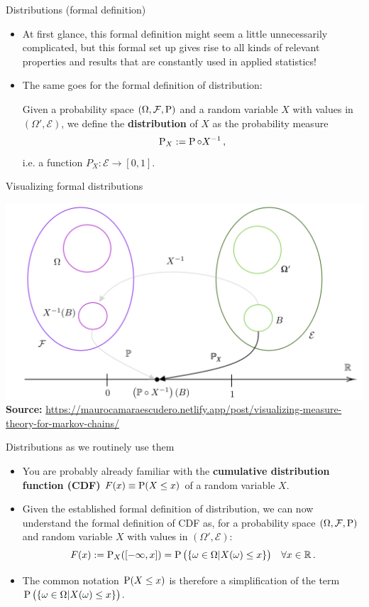 \documentclass[a4,11pt]{beamer}
\newcommand{\R}{\mathbb{R}}
\newlength{\wideitemsep}
\let\olditem\item
\renewcommand{\item}{\setlength{\itemsep}{\wideitemsep}\olditem}
\begin{document}
\begin{frame}{Distributions (formal definition)}
    \begin{itemize}
        \item At first glance, this formal definition might seem a little unnecessarily complicated, but this formal set up gives rise to all kinds of relevant properties and results that are constantly used in applied statistics!
        \item The same goes for the formal definition of distribution:
        \begin{definition}[Distributions]
            Given a probability space $(\Omega,\mathcal{F},\operatorname{P})$ and a random variable $X$ with values in $(\Omega',\mathcal{E})$, we define the \textbf{distribution} of $X$ as the probability measure $$\operatorname{P}_X :=\operatorname{P} \circ X^{-1}\,,$$
i.e. a function $P_X:\mathcal{E}\longrightarrow [0,1]$.
        \end{definition}
    \end{itemize}
\end{frame}
\begin{frame}{Visualizing formal distributions}
           \begin{center}
       \includegraphics[width=\linewidth]{graphics/ProbabilityDistribution.png}\bigskip\\
       {\tiny \textbf{Source:} \url{https://maurocamaraescudero.netlify.app/post/visualizing-measure-theory-for-markov-chains/}}
   \end{center} 
\end{frame}
\begin{frame}{Distributions as we routinely use them}
    \begin{itemize}
    \item You are probably already familiar with the \textbf{cumulative distribution function (CDF)} $F(x)\equiv \operatorname{P}(X\leq x)$ of a random variable $X$.
        \item Given the established formal definition of distribution, we can now understand the formal definition of CDF as, for a probability space $(\Omega,\mathcal{F},\operatorname{P})$ and random variable $X$ with values in $(\Omega',\mathcal{E})$:
        $$F(x):= \pr_X([-\infty,x])=\pr\big(\{\omega\in\Omega\vert X(\omega)\leq x\}\big)\quad \forall x\in\R\,.$$
    \item The common notation $\operatorname{P}(X\leq x)$ is therefore a simplification of the term $\operatorname{P}\big(\{\omega\in\Omega\vert X(\omega)\leq x\}\big)$.
    \end{itemize}
\end{frame}
\end{document}
